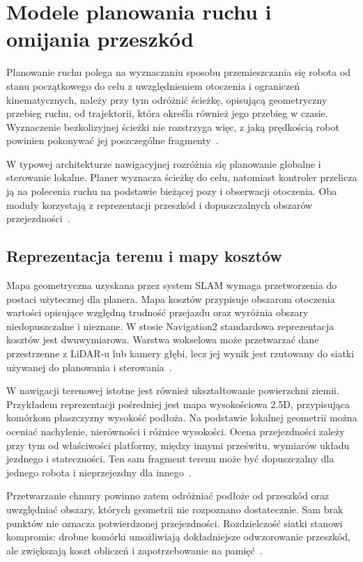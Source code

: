 \documentclass[a4paper,twoside,12pt]{book}
\begin{document}
\section{Modele planowania ruchu i omijania przeszkód}

Planowanie ruchu polega na wyznaczaniu sposobu przemieszczania się robota od stanu początkowego do celu z uwzględnieniem otoczenia i ograniczeń kinematycznych, należy przy tym odróżnić ścieżkę, opisującą geometryczny przebieg ruchu, od trajektorii, która określa również jego przebieg w czasie. Wyznaczenie bezkolizyjnej ścieżki nie rozstrzyga więc, z jaką prędkością robot powinien pokonywać jej poszczególne fragmenty~\cite{rb35_lavalle2006}.

W typowej architekturze nawigacyjnej rozróżnia się planowanie globalne i sterowanie lokalne. Planer wyznacza ścieżkę do celu, natomiast kontroler przelicza ją na polecenia ruchu na podstawie bieżącej pozy i obserwacji otoczenia. Oba moduły korzystają z reprezentacji przeszkód i dopuszczalnych obszarów przejezdności~\cite{rb3_nav2_costmap}.

\subsection{Reprezentacja terenu i mapy kosztów}

Mapa geometryczna uzyskana przez system SLAM wymaga przetworzenia do postaci użytecznej dla planera. Mapa kosztów przypisuje obszarom otoczenia wartości opisujące względną trudność przejazdu oraz wyróżnia obszary niedopuszczalne i nieznane. W stosie Navigation2 standardowa reprezentacja kosztów jest dwuwymiarowa. Warstwa wokselowa może przetwarzać dane przestrzenne z LiDAR-u lub kamery głębi, lecz jej wynik jest rzutowany do siatki używanej do planowania i sterowania~\cite{rb3_nav2_costmap,rb35_nav2_voxel}.

W nawigacji terenowej istotne jest również ukształtowanie powierzchni ziemii. Przykładem reprezentacji pośredniej jest mapa wysokościowa 2.5D, przypisująca komórkom płaszczyzny wysokość podłoża. Na podstawie lokalnej geometrii można oceniać nachylenie, nierówności i różnice wysokości. Ocena przejezdności zależy przy tym od właściwości platformy, między innymi prześwitu, wymiarów układu jezdnego i stateczności. Ten sam fragment terenu może być dopuszczalny dla jednego robota i nieprzejezdny dla innego~\cite{drones8090419}.

Przetwarzanie chmury powinno zatem odróżniać podłoże od przeszkód oraz uwzględniać obszary, których geometrii nie rozpoznano dostatecznie. Sam brak punktów nie oznacza potwierdzonej przejezdności. Rozdzielczość siatki stanowi kompromis: drobne komórki umożliwiają dokładniejsze odwzorowanie przeszkód, ale zwiększają koszt obliczeń i zapotrzebowanie na pamięć~\cite{rb3_nav2_costmap}.
\end{document}
